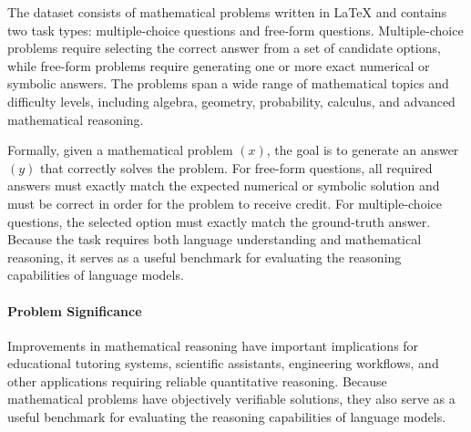 \documentclass{article}
\begin{document}
The dataset consists of mathematical problems written in LaTeX and contains two task types:  multiple-choice questions and free-form questions. Multiple-choice problems require selecting the correct answer from a set of candidate options, while free-form problems require generating one or more exact numerical or symbolic answers. The problems span a wide range of mathematical topics and difficulty levels, including algebra, geometry, probability, calculus, and advanced mathematical reasoning.

Formally, given a mathematical problem $(x)$, the goal is to generate an answer $(y)$ that correctly solves the problem. For free-form questions, all required answers must exactly match the expected numerical or symbolic solution and must be correct in order for the problem to receive credit. For multiple-choice questions, the selected option must exactly match the ground-truth answer. Because the task requires both language understanding and mathematical reasoning, it serves as a useful benchmark for evaluating the reasoning capabilities of language models.

\paragraph{Problem Significance}
Improvements in mathematical reasoning have important implications for educational tutoring systems, scientific assistants, engineering workflows, and other applications requiring reliable quantitative reasoning. Because mathematical problems have objectively verifiable solutions, they also serve as a useful benchmark for evaluating the reasoning capabilities of language models.


\end{document}
